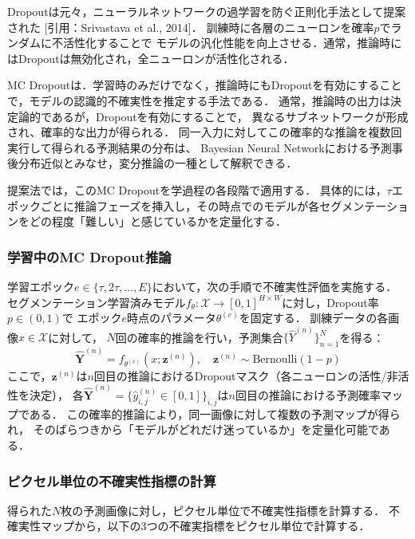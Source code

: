\documentclass[10pt, a4paper, twocolumn]{jarticle}
\begin{document}
Dropoutは元々，ニューラルネットワークの過学習を防ぐ正則化手法として提案された [引用：Srivastava et al., 2014]．
訓練時に各層のニューロンを確率$p$でランダムに不活性化することで
モデルの汎化性能を向上させる．通常，推論時にはDropoutは無効化され，全ニューロンが活性化される．

MC Dropoutは．学習時のみだけでなく，推論時にもDropoutを有効にすることで，モデルの認識的不確実性を推定する手法である．
通常，推論時の出力は決定論的であるが，Dropoutを有効にすることで，
異なるサブネットワークが形成され、確率的な出力が得られる．
同一入力に対してこの確率的な推論を複数回実行して得られる予測結果の分布は、
Bayesian Neural Networkにおける予測事後分布近似とみなせ，変分推論の一種として解釈できる．

提案法では，このMC Dropoutを学過程の各段階で適用する．
具体的には，$\tau$エポックごとに推論フェーズを挿入し，その時点でのモデルが各セグメンテーションをどの程度「難しい」と感じているかを定量化する．

\subsubsection{学習中のMC Dropout推論}
学習エポック$e \in \{\tau, 2\tau, \ldots, E\}$において，次の手順で不確実性評価を実施する．
セグメンテーション学習済みモデル$f_{\theta}: \mathcal{X} \rightarrow [0,1]^{H \times W}$に対し，Dropout率$p \in (0,1)$で
エポック$e$時点のパラメータ$\theta^{(e)}$を固定する．
訓練データの各画像$x \in \mathcal{X}$に対して，
$N$回の確率的推論を行い，予測集合$\{\hat{Y}^{(n)}\}_{n=1}^{N}$を得る：
%
\begin{equation}
  \hat{\mathbf{Y}}^{(n)} = f_{\theta^{(e)}}(x; \mathbf{z}^{(n)}), \quad \mathbf{z}^{(n)} \sim \text{Bernoulli}(1-p)
\end{equation}
%
ここで，$\mathbf{z}^{(n)}$は$n$回目の推論におけるDropoutマスク（各ニューロンの活性/非活性を決定），
各$\hat{\mathbf{Y}}^{(n)} = \{\hat{y}_{i,j}^{(n)} \in [0,1]\}_{i,j}$は$n$回目の推論における予測確率マップである．
この確率的推論により，同一画像に対して複数の予測マップが得られ，
そのばらつきから「モデルがどれだけ迷っているか」を定量化可能である．

\subsubsection{ピクセル単位の不確実性指標の計算}
得られた$N$枚の予測画像に対し，ピクセル単位で不確実性指標を計算する．
不確実性マップから，以下の3つの不確実指標をピクセル単位で計算する．
\end{document}
